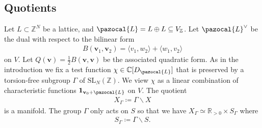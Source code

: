 \documentclass[a4paper,11pt]{amsart} %
\newcommand{\8}{\infty}
\newcommand{\Z}{\mathbb{Z}}
\newcommand{\id}{\mathbf{1}}
\newcommand{\vbf}{\mathbf{v}}
\newcommand{\SL}{\mathrm{SL}}
\newcommand{\R}{\mathbb{R}}
\newcommand{\C}{\mathbb{C}}
\newcommand{\Lcal}{\pazocal{L}}
\theoremstyle{mytheoremstyle}
\theoremstyle{remark}
\numberwithin{equation}{section}
\begin{document}
\subsection{Quotients} Let $L \subset \Z^{N}$ be a lattice, and $\Lcal=L \oplus L \subseteq V_\Z$. Let $\Lcal^\vee$ be the dual with respect to the bilinear form
\begin{align}
B(\vbf_1,\vbf_2)=\langle v_1,w_2 \rangle +  \langle w_1,v_2 \rangle
\end{align} on $V$. Let $Q(\vbf)=\frac{1}{2}B(\vbf,\vbf)$ be the associated quadratic form. As in the introduction we fix a test function $\chi \in \C[D_\Lcal]$ that is preserved by a torsion-free subgroup $\Gamma$ of $\SL_N(\Z)$. We view $\chi$ as a linear combination of characteristic functions $\id_{\vbf_0+\Lcal}$ on $V$. The quotient
\begin{align}
    X_\Gamma \coloneqq \Gamma \backslash X
\end{align}
is a manifold. The group $\Gamma$ only acts on $S$ so that we have $X_\Gamma \simeq \R_{>0} \times S_\Gamma$ where
\begin{align}
    S_\Gamma \coloneqq \Gamma \backslash S.
\end{align}
\end{document}
